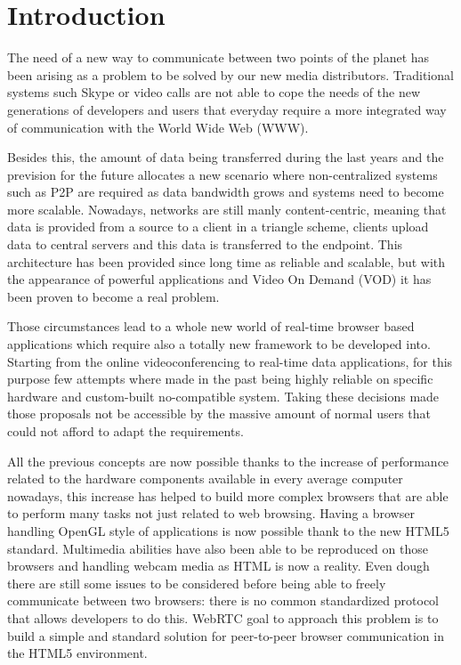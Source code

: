 \section{Introduction}

\thispagestyle{empty}

The need of a new way to communicate between two points of the planet has been arising as a problem to be solved by our new media distributors. Traditional systems such Skype or video calls are not able to cope the needs of the new generations of developers and users that everyday require a more integrated way of communication with the World Wide Web (WWW). 

Besides this, the amount of data being transferred during the last years and the prevision for the future allocates a new scenario where non-centralized systems such as P2P are required as data bandwidth grows and systems need to become more scalable. Nowadays, networks are still manly content-centric, meaning that data is provided from a source to a client in a triangle scheme, clients upload data to central servers and this data is transferred to the endpoint. This architecture has been provided since long time as reliable and scalable, but with the appearance of powerful applications and Video On Demand (VOD) it has been proven to become a real problem.

Those circumstances lead to a whole new world of real-time browser based applications which require also a totally new framework to be developed into. Starting from the online videoconferencing to real-time data applications, for this purpose few attempts where made in the past being highly reliable on specific hardware and custom-built no-compatible system. Taking these decisions made those proposals not be accessible by the massive amount of normal users that could not afford to adapt the requirements. 

All the previous concepts are now possible thanks to the increase of performance related to the hardware components available in every average computer nowadays, this increase has helped to build more complex browsers that are able to perform many tasks not just related to web browsing. Having a browser handling OpenGL style of applications is now possible thank to the new HTML5 standard. Multimedia abilities have also been able to be reproduced on those browsers and handling webcam media as HTML is now a reality. Even dough there are still some issues to be considered before being able to freely communicate between two browsers: there is no common standardized protocol that allows developers to do this. WebRTC goal to approach this problem is to build a simple and standard solution for peer-to-peer browser communication \cite{alvestrandOverview2012} in the HTML5 environment.

